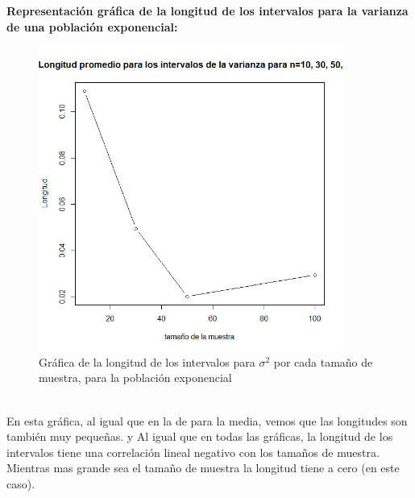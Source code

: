 \documentclass[letterpaper,12pt,onecolumn,titlepage]{article}
\begin{document}
\pagebreak\textbf{Representaci\'{o}n gr\'{a}fica de la longitud de los intervalos para la varianza de una poblaci\'{o}n exponencial:}
~\\ \begin{figure}[!h]
    \begin{center}
        \includegraphics[width=10cm]{Figuras/P1bV.png}
        \caption{Gr\'{a}fica de la longitud de los intervalos para $\sigma^2$ por cada tama\~{n}o de muestra, para la poblaci\'{o}n exponencial}
        \label{fig:Densidad}
    \end{center}
\end{figure}
~\\ En esta gr\'{a}fica, al igual que en la de para la media, vemos que las longitudes son tambi\'{e}n muy peque\~{n}as. y Al igual que en todas las gr\'{a}ficas, la longitud de los intervalos tiene una correlaci\'{o}n lineal negativo con los tama\~{n}os de muestra. Mientras mas grande sea el tama\~{n}o de muestra la longitud tiene a cero (en este caso).
\end{document}
